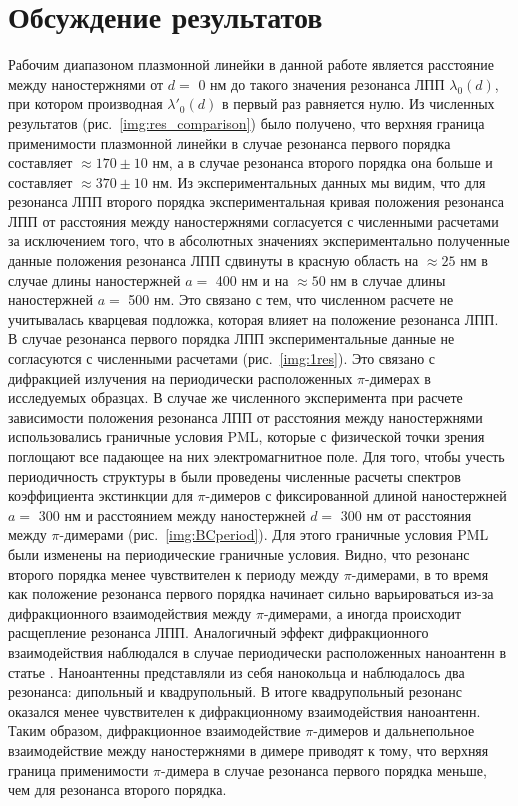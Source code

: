 \section{Обсуждение результатов}

Рабочим диапазоном плазмонной линейки в данной работе является расстояние между наностержнями от $ d = $ 0 нм до такого значения резонанса ЛПП $ \lambda_0 (d)$, при котором производная $ \lambda'_0 (d) $  в первый раз равняется нулю. Из численных результатов (рис.~\ref{img:res_comparison}) было получено, что верхняя граница применимости плазмонной линейки в случае резонанса первого порядка составляет $ \approx 170 \pm 10 $ нм, а в случае резонанса второго порядка она больше и составляет $ \approx 370 \pm 10 $ нм. Из экспериментальных данных мы видим, что для резонанса ЛПП второго порядка экспериментальная кривая положения резонанса ЛПП от расстояния между наностержнями согласуется с численными расчетами за исключением того, что в абсолютных значениях экспериментально полученные данные положения резонанса ЛПП сдвинуты в красную область на  $ \approx 25 $ нм в случае длины наностержней $ a = $ 400 нм и на $ \approx 50 $ нм в случае длины наностержней $ a = $ 500 нм. Это связано с тем, что численном расчете не учитывалась кварцевая подложка, которая влияет на положение резонанса ЛПП. В случае резонанса первого порядка ЛПП экспериментальные данные не согласуются с численными расчетами (рис.~\ref{img:1res}). Это связано с дифракцией излучения на периодически расположенных $ \pi $-димерах в исследуемых образцах. В случае же численного эксперимента при расчете зависимости положения резонанса ЛПП от расстояния между наностержнями использовались граничные условия PML, которые с физической точки зрения поглощают все падающее на них электромагнитное поле. Для того, чтобы учесть периодичность структуры в были проведены численные расчеты спектров коэффициента экстинкции для $ \pi $-димеров с фиксированной длиной наностержней $ a = $ 300 нм и расстоянием между наностержней $ d = $ 300 нм от расстояния между $ \pi $-димерами (рис.~\ref{img:BCperiod}). Для этого граничные условия PML были изменены на периодические граничные условия. Видно, что резонанс второго порядка менее чувствителен к периоду между $ \pi $-димерами, в то время как положение резонанса первого порядка начинает сильно варьироваться из-за дифракционного взаимодействия между $ \pi $-димерами, а иногда происходит расщепление резонанса ЛПП. Аналогичный эффект дифракционного взаимодействия наблюдался в случае периодически расположенных наноантенн в статье \cite{diffractionCoupling}. Наноантенны представляли из себя нанокольца и наблюдалось два резонанса: дипольный и квадрупольный. В итоге квадрупольный резонанс оказался менее чувствителен к дифракционному взаимодействия наноантенн.
Таким образом, дифракционное взаимодействие $ \pi $-димеров и дальнепольное взаимодействие между наностержнями в димере приводят к тому, что верхняя граница применимости $ \pi $-димера в случае резонанса первого порядка меньше, чем для резонанса второго порядка. 